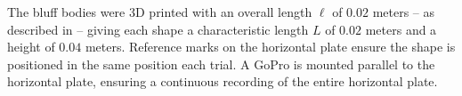 The bluff bodies were 3D printed with an overall length $\ell$ of $0.02$ meters – as described in  – giving each shape a characteristic length $L$ of $0.02$ meters and a height of $0.04$ meters. Reference marks on the horizontal plate ensure the shape is positioned in the same position each trial. A GoPro is mounted parallel to the horizontal plate, ensuring a continuous recording of the entire horizontal plate. 



